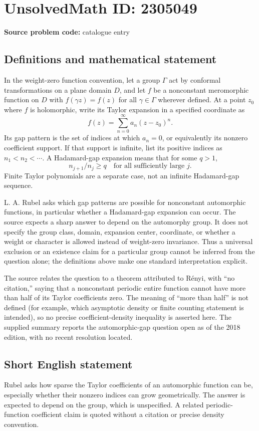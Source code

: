 \documentclass[11pt]{article}
\begin{document}
\section*{UnsolvedMath ID: 2305049}
\textbf{Source problem code:} catalogue entry
\subsection{Definitions and mathematical statement}
In the weight-zero function convention, let a group $\Gamma$ act by conformal transformations on a plane domain $D$, and let $f$ be a nonconstant meromorphic function on $D$ with $f(\gamma z)=f(z)$ for all $\gamma\in\Gamma$ wherever defined. At a point $z_0$ where $f$ is holomorphic, write its Taylor expansion in a specified coordinate as
\[
f(z)=\sum_{n=0}^\infty a_n(z-z_0)^n.
\]
Its gap pattern is the set of indices at which $a_n=0$, or equivalently its nonzero coefficient support. If that support is infinite, list its positive indices as $n_1<n_2<\cdots$. A Hadamard-gap expansion means that for some $q>1$,
\[
n_{j+1}/n_j\geq q
\quad\text{for all sufficiently large }j.
\]
Finite Taylor polynomials are a separate case, not an infinite Hadamard-gap sequence.

L. A. Rubel asks which gap patterns are possible for nonconstant automorphic functions, in particular whether a Hadamard-gap expansion can occur. The source expects a sharp answer to depend on the automorphy group. It does not specify the group class, domain, expansion center, coordinate, or whether a weight or character is allowed instead of weight-zero invariance. Thus a universal exclusion or an existence claim for a particular group cannot be inferred from the question alone; the definitions above make one standard interpretation explicit.

The source relates the question to a theorem attributed to R\'enyi, with ``no citation,'' saying that a nonconstant periodic entire function cannot have more than half of its Taylor coefficients zero. The meaning of ``more than half'' is not defined (for example, which asymptotic density or finite counting statement is intended), so no precise coefficient-density inequality is asserted here. The supplied summary reports the automorphic-gap question open as of the 2018 edition, with no recent resolution located.
\subsection{Short English statement}
Rubel asks how sparse the Taylor coefficients of an automorphic function can be, especially whether their nonzero indices can grow geometrically. The answer is expected to depend on the group, which is unspecified. A related periodic-function coefficient claim is quoted without a citation or precise density convention.
\end{document}
